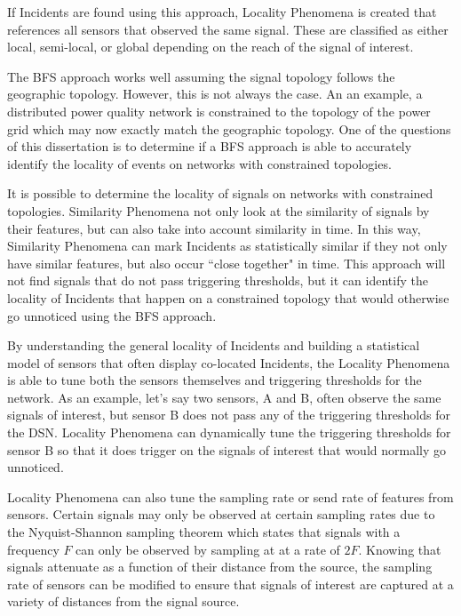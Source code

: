 If Incidents are found using this approach, Locality Phenomena is created that references all sensors that observed the same signal. These are classified as either local, semi-local, or global depending on the reach of the signal of interest.

The BFS approach works well assuming the signal topology follows the geographic topology. However, this is not always the case. An an example, a distributed power quality network is constrained to the topology of the power grid which may now exactly match the geographic topology. One of the questions of this dissertation is to determine if a BFS approach is able to accurately identify the locality of events on networks with constrained topologies.

It is possible to determine the locality of signals on networks with constrained topologies. Similarity Phenomena not only look at the similarity of signals by their features, but can also take into account similarity in time. In this way, Similarity Phenomena can mark Incidents as statistically similar if they not only have similar features, but also occur ``close together" in time. This approach will not find signals that do not pass triggering thresholds, but it can identify the locality of Incidents that happen on a constrained topology that would otherwise go unnoticed using the BFS approach.

By understanding the general locality of Incidents and building a statistical model of sensors that often display co-located Incidents, the Locality Phenomena is able to tune both the sensors themselves and triggering thresholds for the network. As an example, let's say two sensors, A and B, often observe the same signals of interest, but sensor B does not pass any of the triggering thresholds for the DSN. Locality Phenomena can dynamically tune the triggering thresholds for sensor B so that it does trigger on the signals of interest that would normally go unnoticed.

Locality Phenomena can also tune the sampling rate or send rate of features from sensors. Certain signals may only be observed at certain sampling rates due to the Nyquist-Shannon sampling theorem\cite{landau1967sampling} which states that signals with a frequency $F$ can only be observed by sampling at at a rate of $2F$. Knowing that signals attenuate as a function of their distance from the source, the sampling rate of sensors can be modified to ensure that signals of interest are captured at a variety of distances from the signal source.

